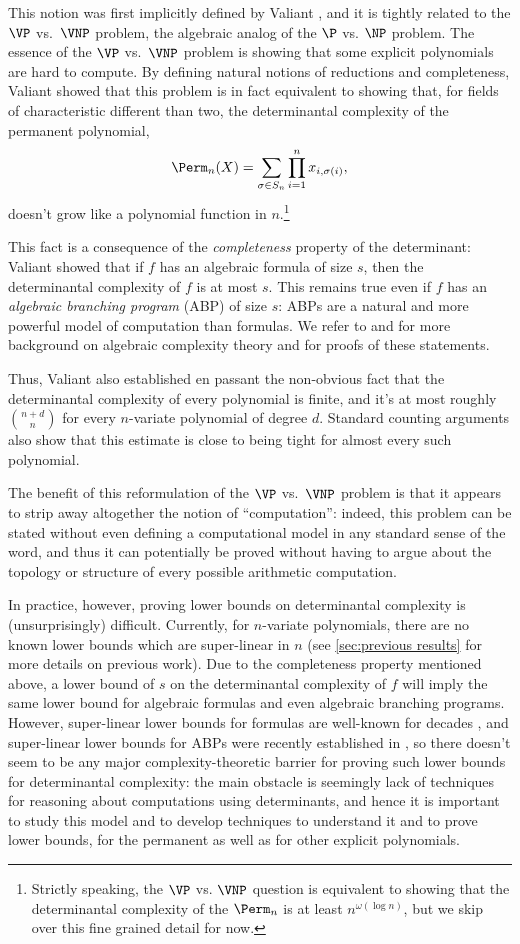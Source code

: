 This notion was first implicitly defined by Valiant \cite{V79}, and it is tightly related to the $\VP$ vs.\ $\VNP$ problem, the algebraic analog of the $\P$ vs. $\NP$ problem. The essence of the $\VP$ vs.\ $\VNP$ problem is showing that some explicit polynomials are hard to compute. By defining natural notions of reductions and completeness, Valiant showed that this problem is in fact equivalent to showing that, for fields of characteristic different than two, the determinantal complexity of the permanent polynomial,
\[
\Perm_n(X)  = \sum_{\sigma \in S_n} \prod_{i=1}^n x_{i,\sigma(i)},
\]
doesn't grow like a polynomial function in $n.$\footnote{Strictly speaking, the $\VP$ vs. $\VNP$ question is equivalent to showing that the determinantal complexity of the $\Perm_n$ is at least $n^{\omega(\log n)}$, but we skip over this fine grained detail for now.}

This fact is a consequence of the \emph{completeness} property of the determinant: Valiant showed that if $f$ has an algebraic formula of size $s$, then the determinantal complexity of $f$ is at most $s$. This remains true even if $f$ has an \emph{algebraic branching program} (ABP) of size $s$: ABPs are a natural and more powerful model of computation than formulas. We refer to \cite{SY10} and \cite{S15} for more background on algebraic complexity theory and for proofs of these statements.

Thus, Valiant also established en passant the non-obvious fact that the determinantal complexity of every polynomial is finite, and it's at most roughly $\binom{n+d}{n}$ for every $n$-variate polynomial of degree $d$. Standard counting arguments also show that this estimate is close to being tight for almost every such polynomial.

The benefit of this reformulation of the $\VP$ vs.\ $\VNP$ problem is that it appears to strip away altogether the notion of ``computation'': indeed, this problem can be stated without even defining a computational model in any standard sense of the word, and thus it can potentially be proved without having to argue about the topology or structure of every possible arithmetic computation.

In practice, however, proving lower bounds on determinantal complexity is (unsurprisingly) difficult. Currently, for $n$-variate polynomials, there are no known lower bounds which are super-linear in $n$ (see \autoref{sec:previous results} for more details on previous work). Due to the completeness property mentioned above, a lower bound of $s$ on the determinantal complexity of $f$ will imply the same lower bound for algebraic formulas and even algebraic branching programs. However, super-linear lower bounds for formulas are well-known for decades \cite{K85}, and super-linear lower bounds for ABPs were recently established in \cite{CKSV19}, so there doesn't seem to be any major complexity-theoretic barrier for proving such lower bounds for determinantal complexity: the main obstacle is seemingly lack of techniques for reasoning about computations using determinants, and hence it is important to study this model and to develop techniques to understand it and to prove lower bounds, for the permanent as well as for other explicit polynomials.

